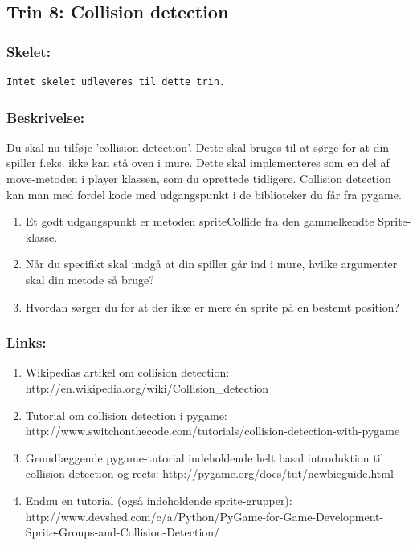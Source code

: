 \documentclass[10pt,a4paper,danish]{article}
\begin{document}
\subsection{Trin 8: Collision detection }
\subsubsection{Skelet:} 
\begin{verbatim}
Intet skelet udleveres til dette trin. 
\end{verbatim}
\subsubsection{Beskrivelse:}
Du skal nu tilføje 'collision detection'. Dette skal bruges
til at sørge for at din spiller f.eks. ikke kan stå oven i 
mure. Dette skal implementeres som en del af move-metoden i 
player klassen, som du oprettede tidligere.
Collision detection kan man med fordel kode med udgangspunkt
i de biblioteker du får fra pygame.

\begin{enumerate}
\item Et godt udgangspunkt er metoden spriteCollide fra den gammelkendte
Sprite-klasse. 
\item Når du specifikt skal undgå at din spiller går ind i mure, hvilke 
argumenter skal din metode så bruge?
\item Hvordan sørger du for at der ikke er mere én sprite på en bestemt
position?
\end{enumerate}

\subsubsection{Links:}
\begin{enumerate}
\item Wikipedias artikel om collision detection: http://en.wikipedia.org/wiki/Collision\_detection
\item Tutorial om collision detection i pygame: http://www.switchonthecode.com/tutorials/collision-detection-with-pygame
\item Grundlæggende pygame-tutorial indeholdende helt basal introduktion til collision detection
og rects: http://pygame.org/docs/tut/newbieguide.html
\item Endnu en tutorial (også indeholdende sprite-grupper): http://www.devshed.com/c/a/Python/PyGame-for-Game-Development-Sprite-Groups-and-Collision-Detection/
\end{enumerate}
\end{document}
